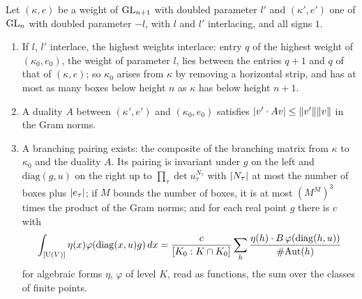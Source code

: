 \begin{lemma}\label{lem:branching-pairing}
Let $(\kappa,e)$ be a weight of $\operatorname{GL}_{n+1}$ with doubled parameter $l'$ and $(\kappa',e')$ one of $\operatorname{GL}_n$ with doubled parameter $-l$, with $l$ and $l'$ interlacing, and all signs $1$.
\begin{enumerate}[label=\textup{(\alph*)}]
\item If $l$, $l'$ interlace, the highest weights interlace: entry $q$ of the highest weight of $(\kappa_0,e_0)$, the weight of parameter $l$, lies between the entries $q+1$ and $q$ of that of $(\kappa,e)$; so $\kappa_0$ arises from $\kappa$ by
removing a horizontal strip, and has at most as many boxes below height $n$ as $\kappa$ has below height $n+1$.
\item A duality $A$ between $(\kappa',e')$ and $(\kappa_0,e_0)$ satisfies $\lvert v'\cdot Av\rvert\le\lVert v'\rVert\lVert v\rVert$ in the Gram norms.
\item A branching pairing exists: the composite of the branching matrix from $\kappa$ to $\kappa_0$ and the duality $A$. Its pairing is invariant under $g$ on the left and $\mathrm{diag}(g,u)$ on the right up to $\prod_\tau\det u_\tau^{N_\tau}$ with
$\lvert N_\tau\rvert$ at most the number of boxes plus $\lvert e_\tau\rvert$; if $M$ bounds the number of boxes, it is at most $(M^M)^3$ times the product of the Gram norms; and for each real point $g$ there is $c$ with
\[
  \int_{[\operatorname{U}(V)]}\eta(x)\varphi(\mathrm{diag}(x,u)g)\,dx=\frac c{[K_0:K\cap K_0]}\sum_{h}\frac{\eta(h)\cdot B\,\varphi(\mathrm{diag}(h,u))}{\#\mathrm{Aut}(h)}
\]
for algebraic forms $\eta$, $\varphi$ of level $K$, read as functions, the sum over the classes of finite points.
\end{enumerate}
\end{lemma}

